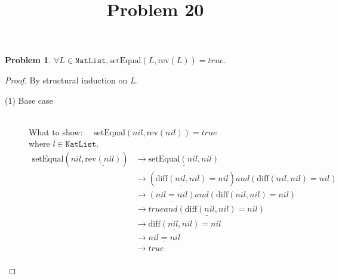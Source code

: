\documentclass[12pt, a4paper]{article}
\title{Problem 20}
\date{\vspace{-5ex}}
\newtheorem{problem}{Problem}
\newcommand{\rel}[1]{\mathrel{#1}}
\newcommand{\rmx}[1]{\mathrm{#1}}
\newcommand{\larrow}{\longrightarrow}
\newcommand{\under}{\underline}
\begin{document}
\maketitle

\begin{problem}
$\forall L \in \mathtt{NatList}, \rmx{setEqual}(L, \rmx{rev}(L)) = true$.
\end{problem}
\begin{proof}
By structural induction on $L$.
\begin{description}
\item[(1) Base case]~\\
\noindent
What to show: $\quad \rmx{setEqual}(nil, \rmx{rev}(nil)) = true$\\
where $l \in \mathtt{NatList}$.
\begin{align*}
\rmx{setEqual}(nil, \under{\rmx{rev}(nil)})
	&\larrow \under{\rmx{setEqual}(nil, nil)} \tag{by rev1} \\
	&\larrow (\under{\rmx{diff}(nil, nil)} = nil) \rel{and} (\rmx{diff}(nil, nil) = nil) \tag{by setEq} \\
	&\larrow \under{(nil = nil)} \rel{and} (\rmx{diff}(nil, nil) = nil) \tag{by diff1} \\
	&\larrow \under{true \rel{and} (\rmx{diff}(nil, nil) = nil)} \tag{by equality} \\
	&\larrow \under{\rmx{diff}(nil, nil)} = nil \tag{by and} \\
	&\larrow \under{nil = nil} \tag{by diff1} \\
	&\larrow true \tag{by equality} \\	
\end{align*}


\end{description}
\end{proof}
\end{document}
